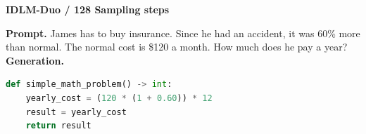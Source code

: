 \begin{tcolorbox}
\par\vspace{1.0mm}
\noindent
\begin{minipage}[t]{0.31\linewidth}
{\footnotesize\bfseries\textcolor{tinyorange}{IDLM-Duo / 128 Sampling steps}}\\[-0.1mm]
\end{minipage}\hfill
\begin{minipage}[t]{0.66\linewidth}
{\scriptsize\bfseries Prompt.}
{\scriptsize James has to buy insurance. Since he had an accident, it was 60\% more than normal. The normal cost is \$120 a month. How much does he pay a year?}\\[-0.1mm]
{\scriptsize\bfseries Generation.}\\[-2.4mm]
\begin{lstlisting}[language=Python,basicstyle=\ttfamily\tiny,columns=fullflexible,keepspaces=true,breaklines=true,aboveskip=0pt,belowskip=0pt,xleftmargin=0.04\linewidth,xrightmargin=0.04\linewidth]
def simple_math_problem() -> int:
    yearly_cost = (120 * (1 + 0.60)) * 12
    result = yearly_cost
    return result
\end{lstlisting}
\end{minipage}
\end{tcolorbox}
